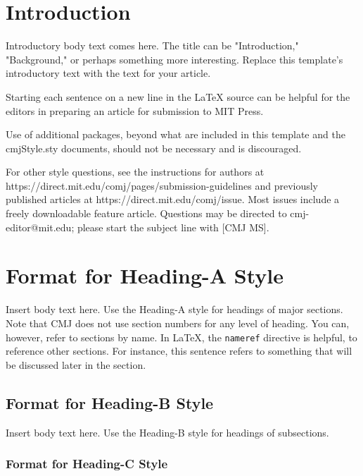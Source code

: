 \documentclass[letterpaper, 12pt]{article}
\begin{document}
\section{Introduction}
Introductory body text comes here. The title can be "Introduction,"  "Background," or perhaps something more interesting.
Replace this template's introductory text with the text for your article.

Starting each sentence on a new line in the LaTeX source can be helpful for the editors in preparing an article for submission to MIT Press.

Use of additional packages, beyond what are included in this template and the cmjStyle.sty documents, should not be necessary and is discouraged. 

For other style questions, see the instructions for authors at https://direct.mit.edu/comj/pages/submission-guidelines and previously published articles at https://direct.mit.edu/comj/issue.  
Most issues include a freely downloadable feature article.  
Questions may be directed to cmj-editor@mit.edu; please start the subject line with [CMJ MS].

\parskip 18pt

%
\section{Format for Heading-A Style}
\label{sec:headA}

Insert body text here.  
Use the Heading-A style for headings of major sections.
Note that CMJ does not use section numbers for any level of heading.
You can, however, refer to sections by name.
In LaTeX, the {\tt nameref} directive is helpful, to reference other sections.
For instance, this sentence refers to something that will be discussed later in the  section.

\vspace*{24pt}

\subsection{Format for Heading-B Style}
\label{sec:headB}

Insert body text here.  
Use the Heading-B style for headings of subsections.

\subsubsection{Format for Heading-C Style}
\label{sec:headC}
\end{document}
